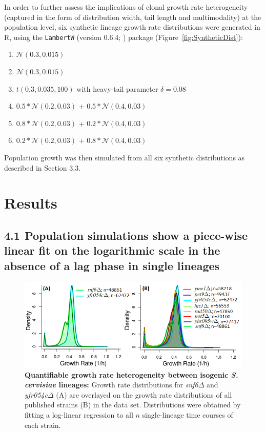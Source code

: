 \documentclass{bioinfo}
\begin{document}
In order to further assess the implications of clonal growth rate heterogeneity (captured in the form of distribution width, tail length and multimodality) at the population level, six synthetic lineage growth rate distributions were generated in R, using the \texttt{LambertW} (version 0.6.4; \citealp{Georg16}) package (Figure~\ref{fig:SyntheticDist}):
\begin{enumerate}
\vspace{-0.5em}
\item $\mathcal{N}(0.3,0.015)$
\item $\mathcal{N}(0.3,0.015)$
\item $t(0.3,0.035,100)$ with heavy-tail parameter $\delta =0.08$
\item $0.5*\mathcal{N}(0.2,0.03)$ + $0.5*\mathcal{N}(0.4,0.03)$ 
\item $0.8*\mathcal{N}(0.2,0.03)$ + $0.2*\mathcal{N}(0.4,0.03)$
\item $0.2*\mathcal{N}(0.2,0.03)$ + $0.8*\mathcal{N}(0.4,0.03)$
\vspace{-0.5em}
\end{enumerate} 
Population growth was then simulated from all six synthetic distributions as described in Section 3.3.

\vspace{-1.5em}
\section{Results}

\subsection*{4.1$\>\>$Population simulations show a piece-wise linear fit on the logarithmic scale in the absence of a lag phase in single lineages}

\begin{figure}[H]
\vspace{-1em}
\centering
\includegraphics[width=1\linewidth]{Ch1Densityb.png}
\vspace{-2em}
\caption{\footnotesize{\textbf{Quantifiable growth rate heterogeneity between isogenic \textit{S. cervisiae} lineages:} Growth rate distributions for \textit{snf6$\Delta$} and \textit{yfr054c$\Delta$} (A) are overlayed on the growth rate distributions of all published strains (B) in the data set. Distributions were obtained by fitting a log-linear regression to all $n$ single-lineage time courses of each strain.}}
\label{fig:DensityPlots}
\vspace{-3em}
\end{figure}
\setcounter{figure}{5}
\end{document}
